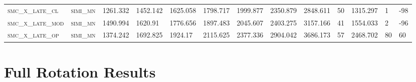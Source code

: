 \begin{landscape}
\begin{center}
\begin{footnotesize}
\begin{longtable}{lllllllllllll}
\textsc{smc\_x\_late\_cl  } & \textsc{simi\_mn  }   & 1261.332 & 1452.142 & 1625.058 & 1798.717 & 1999.877 & 2350.879 & 2848.611 & 50  & 1315.297 & 1   & -98    \\
\textsc{smc\_x\_late\_mod } & \textsc{simi\_mn  }   & 1490.994 & 1620.91  & 1776.656 & 1897.483 & 2045.607 & 2403.275 & 3157.166 & 41  & 1554.033 & 2   & -96    \\
\textsc{smc\_x\_late\_op  } & \textsc{simi\_mn  }   & 1374.242 & 1692.825 & 1924.17  & 2115.625 & 2377.336 & 2904.042 & 3686.173 & 57  & 2468.702 & 80  & 60     \\%

\end{longtable}
\end{footnotesize}
\end{center}
\end{landscape}

\restoregeometry
\pagestyle{headings}

\section{Full Rotation Results}
\label{sec:full-rot-results}

